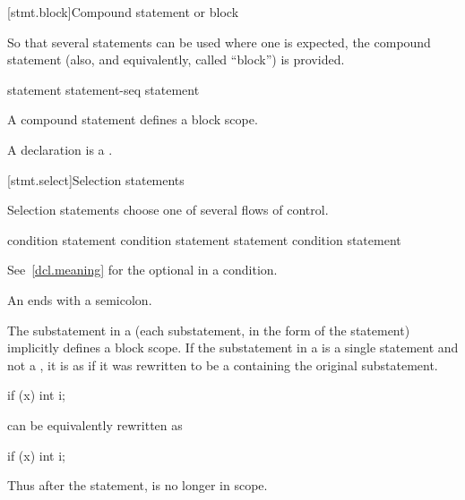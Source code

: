 [stmt.block]{Compound statement or block}%
%
%

\pnum
So that several statements can be used where one is expected, the
compound statement (also, and equivalently, called ``block'') is
provided.

\begin{bnf}
\br
    \terminal{\{}  \terminal{\}}
\end{bnf}

\begin{bnf}
\br
    statement\br
    statement-seq statement
\end{bnf}

A compound statement defines a block scope.
\begin{note}
A declaration is a .
\end{note}

[stmt.select]{Selection statements}%

\pnum
Selection statements choose one of several flows of control.

%
%
%
\begin{bnf}
\br
      \terminal{(}  condition \terminal{)} statement\br
      \terminal{(}  condition \terminal{)} statement  statement\br
     \terminal{(}  condition \terminal{)} statement
\end{bnf}

See~\ref{dcl.meaning} for the optional  in a condition.
\begin{note}
An  ends with a semicolon.
\end{note}

\pnum
{}%
The substatement in a  (each substatement,
in the  form of the  statement) implicitly defines
a block scope. If the substatement in a
 is a single statement and not a
, it is as if it was rewritten to be a
 containing the original substatement.
\begin{example}
\begin{codeblock}
if (x)
  int i;
\end{codeblock}
can be equivalently rewritten as
\begin{codeblock}
if (x) {
  int i;
}
\end{codeblock}

Thus after the  statement,  is no longer in scope.
\end{example}

